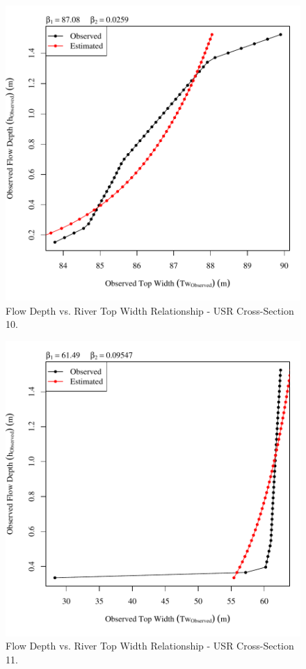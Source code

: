 \begin{center}
\begin{figure}[htbp]
	\includegraphics[width=6in]{"Figures/Results_USR/Survey Tw vs H-Section 10"}
	\caption{Flow Depth vs. River Top Width Relationship - USR Cross-Section 10.}
\end{figure}
\end{center}
\newpage

\begin{center}
\begin{figure}[htbp]
	\includegraphics[width=6in]{"Figures/Results_USR/Survey Tw vs H-Section 11"}
	\caption{Flow Depth vs. River Top Width Relationship - USR Cross-Section 11.}
\end{figure}
\end{center}
\newpage

